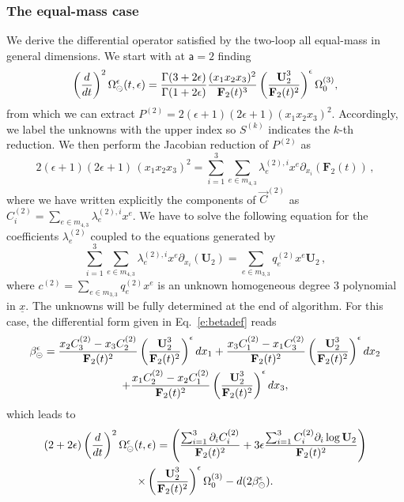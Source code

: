 \documentclass[a4paper,12pt]{article}
\numberwithin{equation}{section}
\numberwithin{figure}{section}
\def\su{\circleddash}
\begin{document}
\subsubsection{The equal-mass case}\label{sec:2sunset1mass}
We derive the differential  operator satisfied by the two-loop all
equal-mass in general dimensions. 
We  start with at $\mathsf{a}=2$ finding
\begin{equation}
 \left(d\over dt\right)^2
 \Omega_{\su}^{\epsilon}(t,\epsilon)={\Gamma(3+2\epsilon)\over\Gamma(1+2\epsilon)} {(x_1x_2x_3)^2\over \textbf{F}_2(t)^3}
 \left(\textbf{U}_2^3\over \textbf{F}_2(t)^2\right)^\epsilon  \Omega_0^{(3)} ,
\end{equation}
from which we can extract $P^{(2)}=2 (\epsilon +1) (2 \epsilon +1)(x_1x_2x_3)^2$. 
%
Accordingly, we label the unknowns with the upper index so $S^{(k)}$ indicates the $k$-th reduction. We then  perform the Jacobian reduction of $P^{(2)}$ as
\begin{equation}\label{e:reduc}
  2 (\epsilon +1) (2 \epsilon +1)\,  (x_1x_2x_3)^2= \sum_{i=1}^3 
  \sum_{e\in m_{4,3}}\lambda^{(2),i}_{e} x^e \partial_{x_i}  (\mathbf{F}_2(t)) \,,
\end{equation}
%
where we have written explicitly the components of $\vec{C}^{(2)}$ as $C^{(2)}_i=\sum_{e\in m_{4,3}}\lambda^{(2),i}_{e} x^e$.
We have to solve the following equation for the coefficients $\lambda_e^{(2)}$ coupled to the equations generated by
\begin{equation}\label{e:C2red}
\sum_{i=1}^3 
\sum_{e\in m_{4,3}}\lambda^{(2),i}_{e} x^e \partial_{x_i}(\mathbf U_2) = \sum_{e\in m_{3,3}} q^{(2)}_e x^e \textbf{U}_2 \,, 
%
\end{equation}
where $c^{(2)}=\sum_{e\in m_{3,3}} q^{(2)}_e x^e$ is an unknown homogeneous degree 3 polynomial
in $\underline x$.
%
The unknowns will be fully determined at the end of  algorithm. For this case, 
the differential form given in Eq.~\eqref{e:betadef} reads
%
 \begin{multline}
 	\label{eq:beta-equalmass-sunset}
   \beta_\su^\epsilon=   {x_2  C_3^{(2)}-x_3  C_2^{(2)}\over
     \textbf{F}_2(t)^2} \left(\textbf{U}_2^3\over \textbf{F}_2(t)^2\right)^\epsilon dx_1+   {x_3  C_1^{(2)}-x_1 C_3^{(2)}\over
     \textbf{F}_2(t)^2} \left(\textbf{U}_2^3\over \textbf{F}_2(t)^2\right)^\epsilon dx_2\cr
   +  {x_1  C_2^{(2)}-x_2  C_1^{(2)}\over
    \textbf{F}_2(t)^2} \left(\textbf{U}_2^3\over \textbf{F}_2(t)^2\right)^\epsilon dx_3, 
 \end{multline}
which leads to 
%
\begin{multline}
 (2+2\epsilon)\left(d\over dt\right)^2
  \Omega_{\su}^{\epsilon}(t,\epsilon)=
 \left({\sum_{i=1}^3 \partial_i C_i^{(2)}\over
     \textbf{F}_2(t)^{2}}+3\epsilon{\sum_{i=1}^3 C_i^{(2)}\partial_i
     \log \textbf{U}_2\over \textbf{F}_2(t)^{2}}\right)\cr \times\left(\textbf{U}_2^3\over \textbf{F}_2(t)^2\right)^\epsilon \Omega_0^{(3)}-d(2\beta_\su^\epsilon).
\end{multline}
\end{document}
